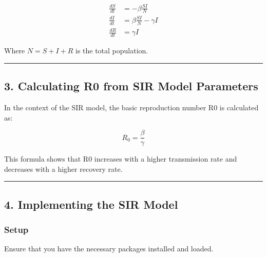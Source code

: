 \documentclass[
]{article}
\begin{document}
\[
\begin{align*}
\frac{dS}{dt} &= -\beta \frac{S I}{N} \\
\frac{dI}{dt} &= \beta \frac{S I}{N} - \gamma I \\
\frac{dR}{dt} &= \gamma I
\end{align*}
\]

Where \(N = S + I + R\) is the total population.

\begin{center}\rule{0.5\linewidth}{0.5pt}\end{center}

\hypertarget{calculating-r0-from-sir-model-parameters}{%
\subsection{3. Calculating R0 from SIR Model
Parameters}\label{calculating-r0-from-sir-model-parameters}}

In the context of the SIR model, the basic reproduction number R0 is
calculated as:

\[
R_0 = \frac{\beta}{\gamma}
\]

This formula shows that R0 increases with a higher transmission rate and
decreases with a higher recovery rate.

\begin{center}\rule{0.5\linewidth}{0.5pt}\end{center}

\hypertarget{implementing-the-sir-model}{%
\subsection{4. Implementing the SIR
Model}\label{implementing-the-sir-model}}

\hypertarget{setup}{%
\subsubsection{Setup}\label{setup}}

Ensure that you have the necessary packages installed and loaded.
\end{document}
